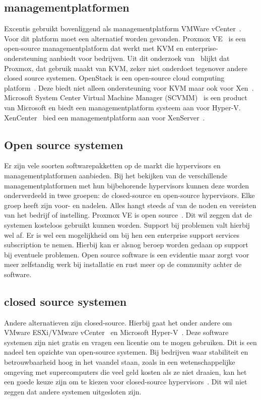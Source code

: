 \subsection{managementplatformen}
Excentis gebruikt bovenliggend als managementplatform VMWare vCenter~\autocite{vmware}. Voor dit platform moet een alternatief worden gevonden.
Proxmox VE~\autocite{Proxmox} is een open-source managementplatform dat werkt met KVM en enterprise-ondersteuning aanbiedt voor bedrijven. Uit dit onderzoek van~\autocite{ally2018comparative} blijkt dat Proxmox, dat gebruik maakt van KVM, zeker niet onderdoet tegenover andere closed source systemen.
OpenStack is een open-source cloud computing platform~\autocite{openstack2024}. Deze biedt niet alleen ondersteuning voor KVM maar ook voor Xen~\autocite{oleksiuk2023comparative}.
Microsoft System Center Virtual Machine Manager (SCVMM)~\autocite{microsoftvmm2025} is een product van Microsoft en biedt een managementplatform systeem aan voor Hyper-V.
XenCenter~\autocite{xencenter2024} bied een managementplatform aan voor XenServer~\autocite{xenserver}.

\subsection{Open source systemen}
Er zijn vele soorten softwarepakketten op de markt die hypervisors en managementplatformen aanbieden. Bij het bekijken van de verschillende managementplatformen met hun bijbehorende hypervisors kunnen deze worden onderverdeeld in twee groepen: de closed-source en open-source hypervisors. Elke groep heeft zijn voor- en nadelen. Alles hangt steeds af van de noden en vereisten van het bedrijf of instelling.
Proxmox VE is open source~\autocite{Proxmox}. Dit wil zeggen dat de systemen kosteloos gebruikt kunnen worden. Support bij problemen valt hierbij wel af. Er is wel een mogelijkheid om bij hen een enterprise support services subscription te nemen. Hierbij kan er alsnog beroep worden gedaan op support bij eventuele problemen.
Open source software is een evidentie maar zorgt voor meer zelfstandig werk bij installatie en rust meer op de community achter de software.

\subsection{closed source systemen}
Andere alternatieven zijn closed-source. Hierbij gaat het onder andere om VMware ESXi/VMware vCenter~\autocite{vmware} en Microsoft Hyper-V~\autocite{Eaton2019}. Deze software systemen zijn niet gratis en vragen een licentie om te mogen gebruiken. Dit is een nadeel ten opzichte van open-source systemen.
Bij bedrijven waar stabiliteit en betrouwbaarheid hoog in het vaandel staan, zoals in een wetenschappelijke omgeving met supercomputers die veel geld kosten als ze niet draaien, kan het een goede keuze zijn om te kiezen voor closed-source hypervisors~\autocite{voras2012early}. Dit wil niet zeggen dat andere systemen uitgesloten zijn.
